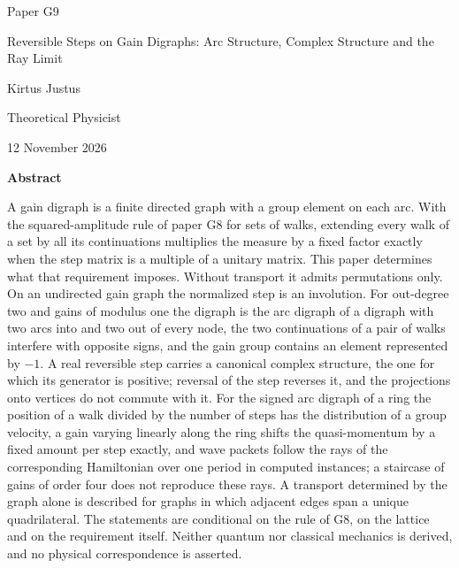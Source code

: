 \documentclass[11pt,a4paper]{article}
\begin{document}
\begin{titlepage}
{\small\sffamily \ProgramTitle\hfill Paper G9\par}
\vspace*{8mm}
{\LARGE\bfseries\raggedright{} Reversible Steps on Gain Digraphs: Arc Structure, Complex Structure and the Ray Limit\par}
\vspace{9mm}
{\large Kirtus Justus\par}
\vspace{1mm}
Theoretical Physicist\par
\AuthorLocation\par
\vspace{2mm}
12 November 2026\par
\vspace{8mm}
\textbf{Abstract}\par
A gain digraph is a finite directed graph with a group element on each arc. With the squared-amplitude rule of paper G8 for sets of walks, extending every walk of a set by all its continuations multiplies the measure by a fixed factor exactly when the step matrix is a multiple of a unitary matrix. This paper determines what that requirement imposes. Without transport it admits permutations only. On an undirected gain graph the normalized step is an involution. For out-degree two and gains of modulus one the digraph is the arc digraph of a digraph with two arcs into and two out of every node, the two continuations of a pair of walks interfere with opposite signs, and the gain group contains an element represented by $-1$. A real reversible step carries a canonical complex structure, the one for which its generator is positive; reversal of the step reverses it, and the projections onto vertices do not commute with it. For the signed arc digraph of a ring the position of a walk divided by the number of steps has the distribution of a group velocity, a gain varying linearly along the ring shifts the quasi-momentum by a fixed amount per step exactly, and wave packets follow the rays of the corresponding Hamiltonian over one period in computed instances; a staircase of gains of order four does not reproduce these rays. A transport determined by the graph alone is described for graphs in which adjacent edges span a unique quadrilateral. The statements are conditional on the rule of G8, on the lattice and on the requirement itself. Neither quantum nor classical mechanics is derived, and no physical correspondence is asserted.\par

\end{titlepage}
\end{document}

